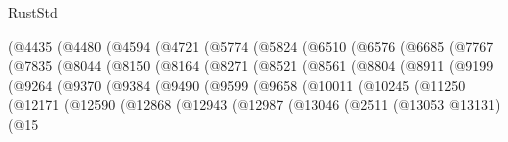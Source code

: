 \begin{lexlean}{RustStd}
\begin{coremodule}
                      (@4435
                        (@4480
                          (@4594
                            (@4721
                              (@5774
                                (@5824
                                  (@6510
                                    (@6576
                                      (@6685
                                        (@7767
                                          (@7835
                                            (@8044
                                              (@8150
                                                (@8164
                                                  (@8271
                                                    (@8521
                                                      (@8561
                                                        (@8804
                                                          (@8911
                                                            (@9199
                                                              (@9264
                                                                (@9370
                                                                  (@9384
                                                                    (@9490
                                                                      (@9599
                                                                        (@9658
                                                                          (@10011
                                                                            (@10245
                                                                              (@11250
                                                                                (@12171
                                                                                  (@12590
                                                                                    (@12868
                                                                                      (@12943
                                                                                        (@12987
                                                                                          (@13046
                                                                                            (@2511
                                                                                              (@13053
                                                                                                @13131)
                                                                                              (@15

\end{coremodule}
\end{lexlean}
